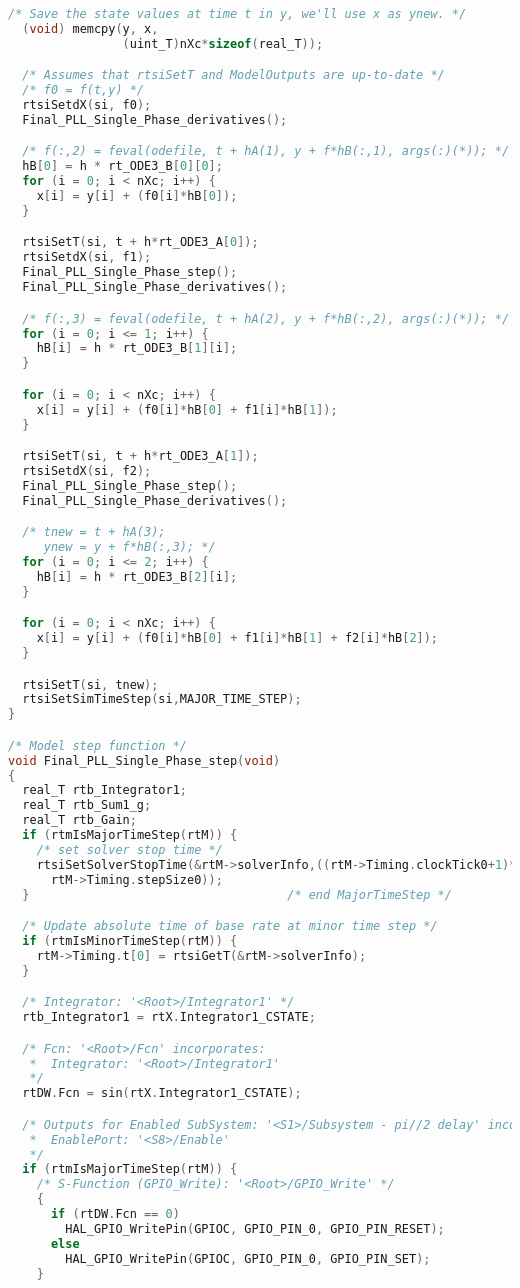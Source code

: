 \begin{lstlisting}[language=C,caption=Model.c]
  /* Save the state values at time t in y, we'll use x as ynew. */
  (void) memcpy(y, x,
                (uint_T)nXc*sizeof(real_T));

  /* Assumes that rtsiSetT and ModelOutputs are up-to-date */
  /* f0 = f(t,y) */
  rtsiSetdX(si, f0);
  Final_PLL_Single_Phase_derivatives();

  /* f(:,2) = feval(odefile, t + hA(1), y + f*hB(:,1), args(:)(*)); */
  hB[0] = h * rt_ODE3_B[0][0];
  for (i = 0; i < nXc; i++) {
    x[i] = y[i] + (f0[i]*hB[0]);
  }

  rtsiSetT(si, t + h*rt_ODE3_A[0]);
  rtsiSetdX(si, f1);
  Final_PLL_Single_Phase_step();
  Final_PLL_Single_Phase_derivatives();

  /* f(:,3) = feval(odefile, t + hA(2), y + f*hB(:,2), args(:)(*)); */
  for (i = 0; i <= 1; i++) {
    hB[i] = h * rt_ODE3_B[1][i];
  }

  for (i = 0; i < nXc; i++) {
    x[i] = y[i] + (f0[i]*hB[0] + f1[i]*hB[1]);
  }

  rtsiSetT(si, t + h*rt_ODE3_A[1]);
  rtsiSetdX(si, f2);
  Final_PLL_Single_Phase_step();
  Final_PLL_Single_Phase_derivatives();

  /* tnew = t + hA(3);
     ynew = y + f*hB(:,3); */
  for (i = 0; i <= 2; i++) {
    hB[i] = h * rt_ODE3_B[2][i];
  }

  for (i = 0; i < nXc; i++) {
    x[i] = y[i] + (f0[i]*hB[0] + f1[i]*hB[1] + f2[i]*hB[2]);
  }

  rtsiSetT(si, tnew);
  rtsiSetSimTimeStep(si,MAJOR_TIME_STEP);
}

/* Model step function */
void Final_PLL_Single_Phase_step(void)
{
  real_T rtb_Integrator1;
  real_T rtb_Sum1_g;
  real_T rtb_Gain;
  if (rtmIsMajorTimeStep(rtM)) {
    /* set solver stop time */
    rtsiSetSolverStopTime(&rtM->solverInfo,((rtM->Timing.clockTick0+1)*
      rtM->Timing.stepSize0));
  }                                    /* end MajorTimeStep */

  /* Update absolute time of base rate at minor time step */
  if (rtmIsMinorTimeStep(rtM)) {
    rtM->Timing.t[0] = rtsiGetT(&rtM->solverInfo);
  }

  /* Integrator: '<Root>/Integrator1' */
  rtb_Integrator1 = rtX.Integrator1_CSTATE;

  /* Fcn: '<Root>/Fcn' incorporates:
   *  Integrator: '<Root>/Integrator1'
   */
  rtDW.Fcn = sin(rtX.Integrator1_CSTATE);

  /* Outputs for Enabled SubSystem: '<S1>/Subsystem - pi//2 delay' incorporates:
   *  EnablePort: '<S8>/Enable'
   */
  if (rtmIsMajorTimeStep(rtM)) {
    /* S-Function (GPIO_Write): '<Root>/GPIO_Write' */
    {
      if (rtDW.Fcn == 0)
        HAL_GPIO_WritePin(GPIOC, GPIO_PIN_0, GPIO_PIN_RESET);
      else
        HAL_GPIO_WritePin(GPIOC, GPIO_PIN_0, GPIO_PIN_SET);
    }


\end{lstlisting}
